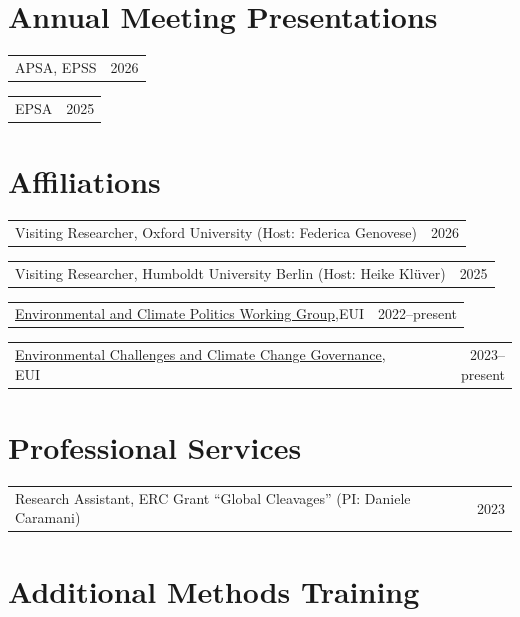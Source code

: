\documentclass[11pt,letterpaper]{article}
\makeatletter
\newcommand{\simpleitem}[2]{%
  \begin{tabularx}{\linewidth}{@{}X r@{}}
    #1 & {\color{muted}#2}\\
  \end{tabularx}\vspace{0.1em}
}
\makeatother
\begin{document}

\section{Annual Meeting Presentations}

\simpleitem{APSA, EPSS}{2026}
\simpleitem{EPSA}{2025}


\section{Affiliations}

\simpleitem{Visiting Researcher, Oxford University (Host: Federica Genovese)}{2026}
\simpleitem{Visiting Researcher, Humboldt University Berlin (Host: Heike Kl\"uver)}{2025}
\simpleitem{\href{https://www.eui.eu/research-hub?id=environmental-and-climate-politics-working-group}{Environmental and Climate Politics Working Group},EUI}{2022--present}
\simpleitem{\href{https://www.eui.eu/research-hub?id=environmental-and-climate-governance}{Environmental Challenges and Climate Change Governance}, EUI}{2023--present}


\section{Professional Services}

\simpleitem{Research Assistant, ERC Grant \enquote{Global Cleavages} (PI: Daniele Caramani)}{2023}


\section{Additional Methods Training}
\end{document}
